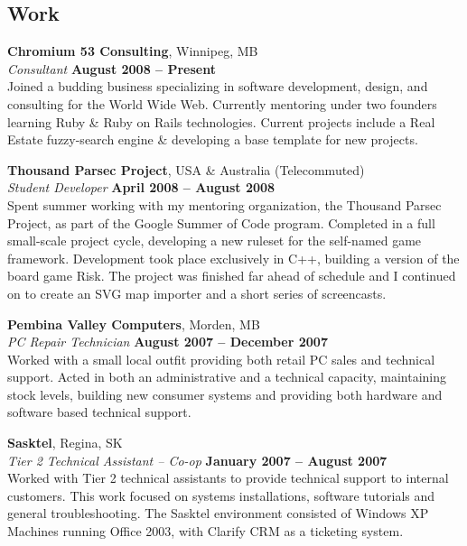 \documentclass[margin,line,letterpaper]{resume}
\begin{document}
\begin{resume}
  \section{\mysidestyle Work}

  {\bf Chromium 53 Consulting}, Winnipeg, MB \vspace{2mm}\\\vspace{1mm}%
  {\sl Consultant} \hfill {\bf August 2008 -- Present}\\
  Joined a budding business specializing in software development, design, and
  consulting for the World Wide Web. Currently mentoring under two founders learning Ruby \& Ruby on Rails technologies. Current projects include a Real Estate fuzzy-search engine & developing a base template for new projects.

{\bf Thousand Parsec Project}, USA \& Australia (Telecommuted) \vspace{2mm}\\\vspace{1mm}%
  {\sl Student Developer } \hfill {\bf April 2008 -- August 2008}\\
  Spent summer working with my mentoring organization, the Thousand Parsec Project, as part of the Google Summer of Code program. Completed in a full small-scale project cycle, developing a new ruleset for the self-named game framework. Development took place exclusively in C++, building a version of the board game Risk. The project was finished far ahead of schedule and I continued on to create an SVG map importer and a short series of screencasts.

  {\bf Pembina Valley Computers}, Morden, MB \vspace{2mm}\\\vspace{1mm}%
  {\sl PC Repair Technician} \hfill {\bf August 2007 -- December 2007}\\
  Worked with a small local outfit providing both retail PC sales and technical support. Acted in both an administrative and a technical capacity, maintaining stock levels, building new consumer systems and providing both hardware and software based technical support.

  {\bf Sasktel}, Regina, SK \vspace{2mm}\\\vspace{1mm}%
  {\sl Tier 2 Technical Assistant -- Co-op} \hfill {\bf January 2007 -- August 2007}\\
  Worked with Tier 2 technical assistants to provide technical support to internal customers. This work focused on systems installations, software tutorials and general troubleshooting. The Sasktel environment consisted of Windows XP Machines running Office 2003, with Clarify CRM as a ticketing system.


\end{resume}
\end{document}
